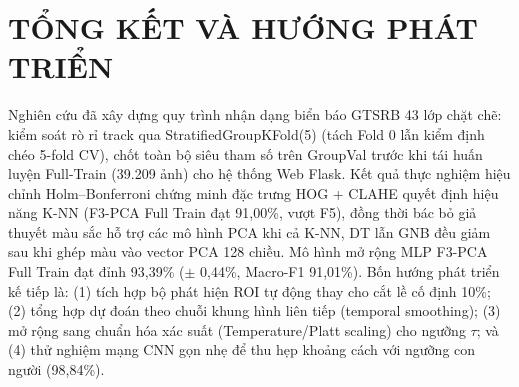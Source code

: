\documentclass[conference]{IEEEtran}
\begin{document}
\section{TỔNG KẾT VÀ HƯỚNG PHÁT TRIỂN}
Nghiên cứu đã xây dựng quy trình nhận dạng biển báo GTSRB 43 lớp chặt chẽ: kiểm soát rò rỉ track qua StratifiedGroupKFold(5) (tách Fold 0 lẫn kiểm định chéo 5-fold CV), chốt toàn bộ siêu tham số trên GroupVal trước khi tái huấn luyện Full-Train (39.209 ảnh) cho hệ thống Web Flask. Kết quả thực nghiệm hiệu chỉnh Holm--Bonferroni chứng minh đặc trưng HOG + CLAHE quyết định hiệu năng K-NN (F3-PCA Full Train đạt 91,00\%, vượt F5), đồng thời bác bỏ giả thuyết màu sắc hỗ trợ các mô hình PCA khi cả K-NN, DT lẫn GNB đều giảm sau khi ghép màu vào vector PCA 128 chiều. Mô hình mở rộng MLP F3-PCA Full Train đạt đỉnh 93,39\% ($\pm$ 0,44\%, Macro-F1 91,01\%). Bốn hướng phát triển kế tiếp là: (1) tích hợp bộ phát hiện ROI tự động thay cho cắt lề cố định 10\%; (2) tổng hợp dự đoán theo chuỗi khung hình liên tiếp (temporal smoothing); (3) mở rộng sang chuẩn hóa xác suất (Temperature/Platt scaling) cho ngưỡng $\tau$; và (4) thử nghiệm mạng CNN gọn nhẹ để thu hẹp khoảng cách với ngưỡng con người (98,84\%).

\end{document}
